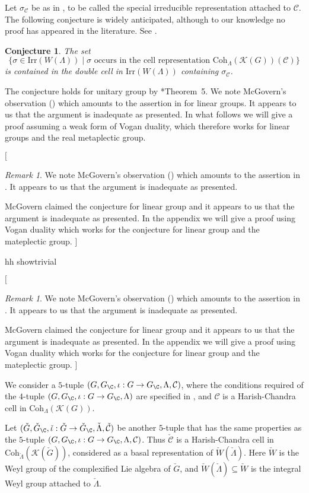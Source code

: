 \documentclass[12pt]{amsart}
\newcommand{\trivial}[2][]{\if\relax\detokenize{#1}\relax
  {%
      \color{orange} \vspace{0em}$[$#2$]$
      \color{black}
  }
  \else
\ifx#1h
\ifcsname showtrivial\endcsname
{%
    \color{orange}\vspace{0em}$[$#2$]$
    \color{black}
}
\fi
\else {\red Wrong argument!} \fi
\fi
}
\newcommand{\CC}{{\mathcal {C}}}
\newcommand{\CK}{{\mathcal {K}}}
\numberwithin{equation}{section}
\newtheorem{conj}[thm]{Conjecture}
\theoremstyle{remark}
\newtheorem{remark}[thm]{Remark}
\def\Irr{\mathrm{Irr}}
\def\Coh{\mathrm{Coh}}
\begin{document}
Let $\sigma_\CC$ be as in , to be called the special irreducible representation attached to $\CC$.
The following conjecture is widely anticipated, although to our knowledge no proof has appeared in the literature. See \cite[page 1055]{V4}.

\begin{conj}\label{conjcell}
The set
\[
 \{ \sigma\in \Irr(W(\Lambda))\mid \sigma\textrm{ occurs in the cell representation $\Coh_{\Lambda}( \CK(G))(\CC)$}\}
\]
is contained in the  double cell in $\Irr(W(\Lambda))$ containing $\sigma_\CC$.
\end{conj}




The conjecture holds for unitary group by \cite{Bo}*{Theorem~5}. We note McGovern's observation (\cite[Page 213]{Mc}) which amounts to the  assertion in  for linear groups. It appears to us that the argument is inadequate as presented. In what follows we will give a proof assuming a weak form of Vogan duality, which therefore works for linear groups and the real metaplectic group.

\trivial[h]{
\begin{remark}
We note McGovern's observation (\cite[Page 213]{Mc}) which amounts to the assertion in \Cref{conjcell}. It appears to us that the argument is inadequate as presented.
\end{remark}


McGovern claimed the conjecture for linear group and it appears to us that the argument is
inadequate as presented.
In the appendix we will give a proof using Vogan duality which works for the conjecture for linear group and the mateplectic group.
}

We consider a $5$-tuple $(G,G_\C, \iota: G\rightarrow G_\C, \Lambda, \CC)$, where the conditions required of the $4$-tuple $(G,G_\C, \iota: G\rightarrow G_\C, \Lambda)$ are specified in , and $\CC$ is a Harish-Chandra cell in $\Coh_{\Lambda}(\CK(G))$.

Let $(\check G,\check G_\C, \check \iota: \check G\rightarrow \check G_\C, \check \Lambda, \check \CC)$ be another $5$-tuple that has the same properties as the $5$-tuple $(G,G_\C, \iota: G\rightarrow G_\C, \Lambda, \CC)$.
Thus $\check \CC$ is a Harish-Chandra cell in $\Coh_{\check \Lambda}(\CK(\check G))$, considered as a basal representation of $\check W(\check \Lambda)$. Here $\check W$ is the Weyl group of the complexified Lie algebra of $\check G$, and $\check W(\check \Lambda)\subseteq \check W$ is the integral Weyl group attached to $\check \Lambda$.
\end{document}
